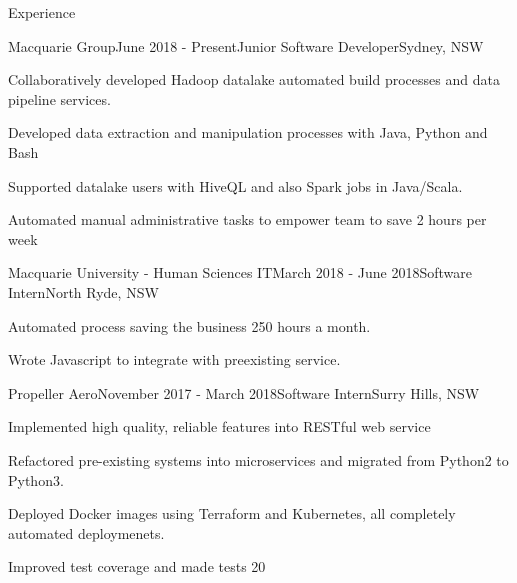 \documentclass{resume} %
\begin{document}

\begin{rSection}{Experience}


    \begin{rSubsection}{Macquarie Group}{June 2018 - Present}{Junior Software Developer}{Sydney, NSW}
    \item Collaboratively developed Hadoop datalake automated build processes and data pipeline services.
    \item Developed data extraction and manipulation processes with Java, Python and Bash
    \item Supported datalake users with HiveQL and also Spark jobs in Java/Scala.
    \item Automated manual administrative tasks to empower team to save 2 hours per week
    \end{rSubsection}
    
    \begin{rSubsection}{Macquarie University - Human Sciences IT}{March 2018 - June 2018}{Software Intern}{North Ryde, NSW}
    \item Automated process saving the business 250 hours a month.
    \item Wrote Javascript to integrate with preexisting service.
    \end{rSubsection}
    
    \begin{rSubsection}{Propeller Aero}{November 2017 - March 2018}{Software Intern}{Surry Hills, NSW}
    \item Implemented high quality, reliable features into RESTful web service
    \item Refactored pre-existing systems into microservices and migrated from Python2 to Python3. 
    \item Deployed Docker images using Terraform and Kubernetes, all completely automated deploymenets.
    \item Improved test coverage and made tests 20%
    \end{rSubsection}
    
    \end{rSection}
    
    
\end{document}
